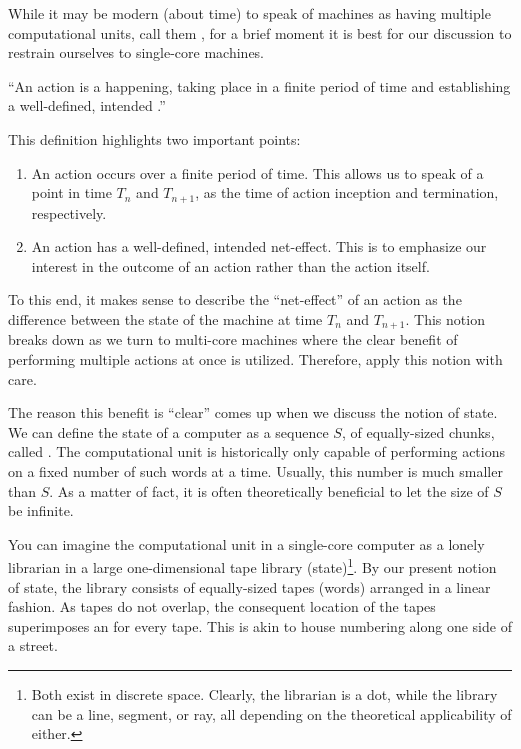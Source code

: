 While it may be modern (about time) to speak of machines as having multiple
computational units, call them , for a brief moment it is best for
our discussion to restrain ourselves to single-core machines.

\begin{definition}

``An action is a happening, taking place in a finite period of time and
establishing a well-defined, intended .''
\cite{dijkstra-introduction}

\end{definition}

This definition highlights two important points:

\begin{enumerate}

\item An action occurs over a finite period of time. This allows us to speak of
a point in time $T_n$ and $T_{n+1}$, as the time of action inception and
termination, respectively.

\item An action has a well-defined, intended net-effect. This is to emphasize
our interest in the outcome of an action rather than the action itself.

\end{enumerate}

To this end, it makes sense to describe the ``net-effect'' of an action as the
difference between the state of the machine at time $T_n$ and $T_{n+1}$. This
notion breaks down as we turn to multi-core machines where the clear benefit of
performing multiple actions at once is utilized. Therefore, apply this notion
with care.

The reason this benefit is ``clear'' comes up when we discuss the notion of
state. We can define the state of a computer as a sequence $S$, of
equally-sized chunks, called . The computational unit is historically
only capable of performing actions on a fixed number of such words at a time.
Usually, this number is much smaller than $S$. As a matter of fact, it is often
theoretically beneficial to let the size of $S$ be infinite.

You can imagine the computational unit in a single-core computer as a lonely
librarian in a large one-dimensional tape library (state)\footnote{Both exist
in discrete space. Clearly, the librarian is a dot, while the library can be a
line, segment, or ray, all depending on the theoretical applicability of
either.}. By our present notion of state, the library consists of equally-sized
tapes (words) arranged in a linear fashion.  As tapes do not overlap, the
consequent location of the tapes superimposes an  for every tape.
This is akin to house numbering along one side of a street.



